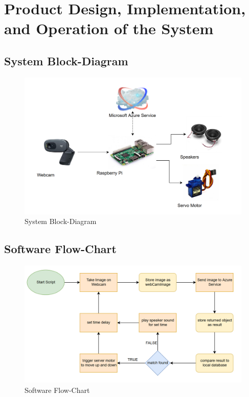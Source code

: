 \documentclass[12pt]{article}
\begin{document}
\vspace{1cm}
\section{Product Design, Implementation, and Operation of the System}
\subsection{System Block-Diagram}
\begin{figure}[h]
    \centering
    \includegraphics[width = \linewidth]{../images/BlockDiagram.png}
    \caption{System Block-Diagram}
\end{figure}


\newpage
\subsection{Software Flow-Chart}
\begin{figure}[h]
    \centering
    \includegraphics[width = \linewidth]{../images/FlowChart.png}
    \caption{Software Flow-Chart}
\end{figure}
\end{document}
